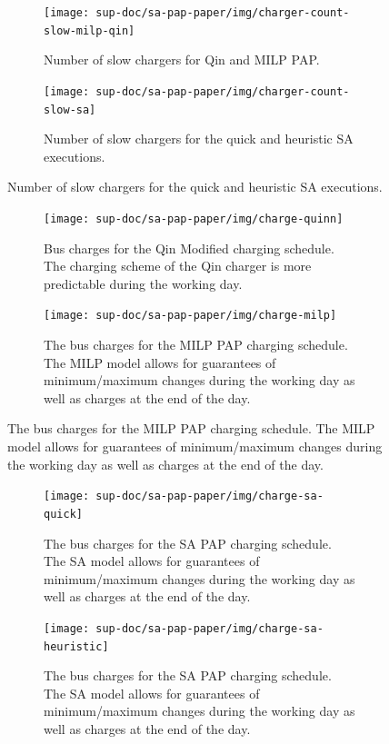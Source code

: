 \documentclass[ee,thesis]{usuthesis}
\begin{document}
\begin{figure}
    \begin{subfigure}[t]{\textwidth}
    \centering
        \texttt{[image: sup-doc/sa-pap-paper/img/charger-count-slow-milp-qin]}
        \caption{Number of slow chargers for Qin and MILP PAP.}
        \label{subfig:slow-charger-usage-milp-qinn}
    \end{subfigure}
    \begin{subfigure}[t]{\textwidth}
    \centering
        \texttt{[image: sup-doc/sa-pap-paper/img/charger-count-slow-sa]}
        \caption{Number of slow chargers for the quick and heuristic SA executions.}
        \label{subfig:slow-charger-usage-sa}
    \end{subfigure}
\end{figure}

\begin{figure}
  \begin{subfigure}[t]{\textwidth}
    \centering
    \texttt{[image: sup-doc/sa-pap-paper/img/charge-quinn]}
    \caption{Bus charges for the Qin Modified charging schedule. The charging scheme of the Qin charger is more predictable during the working day.}
    \label{subfig:qin-charge}
  \end{subfigure}
  \hfill
  \begin{subfigure}[t]{\textwidth}
    \centering
    \texttt{[image: sup-doc/sa-pap-paper/img/charge-milp]}
    \caption{The bus charges for the MILP PAP charging schedule. The MILP model allows for guarantees of minimum/maximum changes during the working day as well as charges at the end of the day.}
    \label{subfig:milp-charge}
  \end{subfigure}
  \hfill
\end{figure}

\begin{figure}\ContinuedFloat
  \begin{subfigure}[t]{\textwidth}
    \centering
    \texttt{[image: sup-doc/sa-pap-paper/img/charge-sa-quick]}
    \caption{The bus charges for the SA PAP charging schedule. The SA model allows for guarantees of minimum/maximum changes during the working day as well as charges at the end of the day.}
    \label{subfig:sa-quick-charge}
  \end{subfigure}
  \hfill
  \begin{subfigure}[t]{\textwidth}
    \centering
    \texttt{[image: sup-doc/sa-pap-paper/img/charge-sa-heuristic]}
    \caption{The bus charges for the SA PAP charging schedule. The SA model allows for guarantees of minimum/maximum changes during the working day as well as charges at the end of the day.}
    \label{subfig:sa-heuristic-charge}
  \end{subfigure}
  \caption{}
  \label{fig:charge}
\end{figure}
\end{document}
